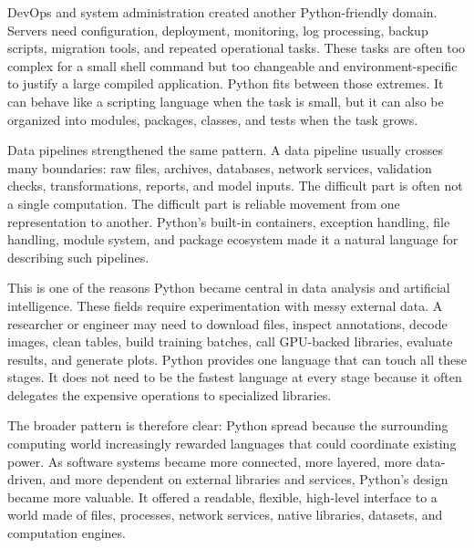 DevOps and system administration created another Python-friendly domain. Servers need configuration, deployment, monitoring, log processing, backup scripts, migration tools, and repeated operational tasks. These tasks are often too complex for a small shell command but too changeable and environment-specific to justify a large compiled application. Python fits between those extremes. It can behave like a scripting language when the task is small, but it can also be organized into modules, packages, classes, and tests when the task grows.

Data pipelines strengthened the same pattern. A data pipeline usually crosses many boundaries: raw files, archives, databases, network services, validation checks, transformations, reports, and model inputs. The difficult part is often not a single computation. The difficult part is reliable movement from one representation to another. Python's built-in containers, exception handling, file handling, module system, and package ecosystem made it a natural language for describing such pipelines.

This is one of the reasons Python became central in data analysis and artificial intelligence. These fields require experimentation with messy external data. A researcher or engineer may need to download files, inspect annotations, decode images, clean tables, build training batches, call GPU-backed libraries, evaluate results, and generate plots. Python provides one language that can touch all these stages. It does not need to be the fastest language at every stage because it often delegates the expensive operations to specialized libraries.

The broader pattern is therefore clear: Python spread because the surrounding computing world increasingly rewarded languages that could coordinate existing power. As software systems became more connected, more layered, more data-driven, and more dependent on external libraries and services, Python's design became more valuable. It offered a readable, flexible, high-level interface to a world made of files, processes, network services, native libraries, datasets, and computation engines.